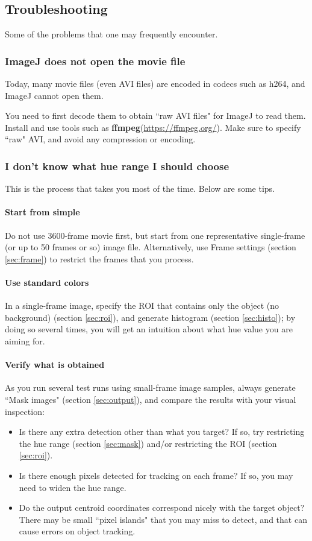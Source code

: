 \documentclass[a4paper,oneside,10pt]{article}
\newcommand{\secref}[1]{(section \ref{sec:#1})}
\begin{document}
\subsection{Troubleshooting}
Some of the problems that one may frequently encounter.

\subsubsection{ImageJ does not open the movie file}
Today, many movie files (even AVI files) are encoded in codecs such as h264, and ImageJ cannot open them.

You need to first decode them to obtain ``raw AVI files" for ImageJ to read them. Install and use tools such as {\bf ffmpeg}(\url{https://ffmpeg.org/}). Make sure to specify ``raw" AVI, and avoid any compression or encoding.

\subsubsection{I don't know what hue range I should choose}
This is the process that takes you most of the time. Below are some tips.

\paragraph{Start from simple}
Do not use 3600-frame movie first, but start from one representative single-frame (or up to 50 frames or so) image file. Alternatively, use Frame settings \secref{frame} to restrict the frames that you process.

\paragraph{Use standard colors}
In a single-frame image, specify the ROI that contains only the object (no background) \secref{roi}, and generate histogram \secref{histo}; by doing so several times, you will get an intuition about what hue value you are aiming for.

\paragraph{Verify what is obtained}
As you run several test runs using small-frame image samples, always generate ``Mask images" \secref{output}, and compare the results with your visual inspection:
\begin{itemize}
\item Is there any extra detection other than what you target? If so, try restricting the hue range \secref{mask} and/or restricting the ROI \secref{roi}.
\item Is there enough pixels detected for tracking on each frame? If so, you may need to widen the hue range.
\item Do the output centroid coordinates correspond nicely with the target object? There may be small ``pixel islands" that you may miss to detect, and that can cause errors on object tracking.
\end{itemize} 
\end{document}

